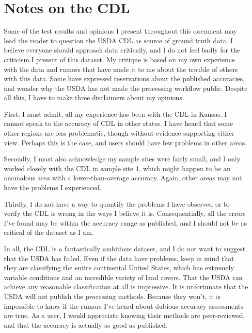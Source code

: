\chapter{Notes on the CDL}
\label{appendix:cdl}

Some of the test results and opinions I present throughout this document may lead the reader to question the USDA CDL as source of ground truth data. I believe everyone should approach data critically, and I do not feel badly for the criticism I present of this dataset. My critique is based on my own experience with the data and rumors that have made it to me about the trouble of others with this data. Some have expressed reservations about the published accuracies, and wonder why the USDA has not made the processing workflow public. Despite all this, I have to make three disclaimers about my opinions.

First, I must admit, all my experience has been with the CDL in Kansas. I cannot speak to the accuracy of CDL in other states. I have heard that some other regions are less problematic, though without evidence supporting either view. Perhaps this is the case, and users should have few problems in other areas.

Secondly, I must also acknowledge my sample sites were fairly small, and I only worked closely with the CDL in sample site 1, which might happen to be an anomalous area with a lower-than-average accuracy. Again, other areas may not have the problems I experienced.

Thirdly, I do not have a way to quantify the problems I have observed or to verify the CDL is wrong in the ways I believe it is. Consequentially, all the errors I've found may be within the accuracy range as published, and I should not be as critical of the dataset as I am.

In all, the CDL is a fantastically ambitious dataset, and I do not want to suggest that the USDA has failed. Even if the data have problems, keep in mind that they are classifying the entire continental United States, which has extremely variable conditions and an incredible variety of land covers. That the USDA can achieve any reasonable classification at all is impressive. It is unfortunate that the USDA will not publish the processing methods. Because they won't, it is impossible to know if the rumors I've heard about dubious accuracy assessments are true. As a user, I would appreciate knowing their methods are peer-reviewed, and that the accuracy is actually as good as published.
